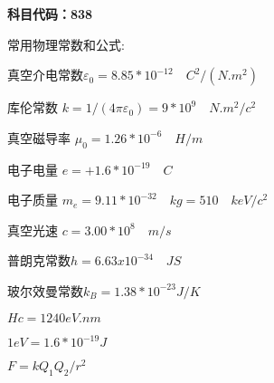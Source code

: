 
\textbf{科目代码：838}

常用物理常数和公式:

真空介电常数$\varepsilon_0=8.85 *10^{-12} \quad C^2/(N.m^2)$

库伦常数 $k=1/(4\pi \varepsilon_0)=9*10^9 \quad N.m^2/c^2$

真空磁导率 $\mu_0=1.26*10^{-6}\quad H/m$

电子电量 $e=+1.6*10^{-19}\quad C$

电子质量 $m_e=9.11*10^{-32}\quad kg=510 \quad keV/c^2$

真空光速 $c=3.00* 10^8 \quad m/s$

普朗克常数$h=6.63x10^{-34}\quad JS$

玻尔效曼常数$k_B =1.38*10^{-23}J/K$

$Hc=1240 eV.nm$

$1 eV=1.6*10^{-19}J$

$F=k Q_1 Q_2/r^2$
